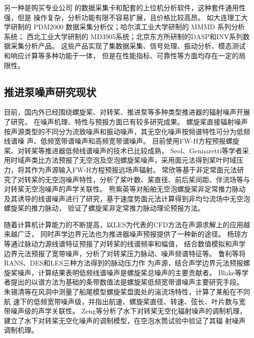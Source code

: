 另一种是购买专业公司
的数据采集卡和配套的上位机分析软件，这种套件通用性强，但是
操作复杂，分析功能有限不容易扩展，且价格比较高昂。
如大连理工大学研制的 PDM2000 数据采集分析仪；哈尔滨工业大学研制的 MMMD 系列分析系统；
西北工业大学研制的 MD3905系统；北京东方所研制的DASP和INV系列数据采集分析产品\cite{dingJi2014}。
这些产品实现了集数据采集、信号处理、振动分析、模态测试和响应计算等多种功能于一体，
但是在性能指标、可靠性等方面均存在一定的局限性。

\subsection{推进泵噪声研究现状}
目前，国内外已经围绕螺旋桨、对转桨、推进泵等多种类型推进器的辐射噪声开展了研究，
在噪声机理、特性与预报方面已有较多研究成果。
螺旋桨直接辐射噪声按声源类型的不同分为流致噪声和振动噪声，其无空化噪声按频谱特性可分为低频线谱噪
声、低频宽带谱噪声和高频宽带谱噪声\cite{cheng2019,xuye2019a}。
目前使用FW-H方程预报螺旋桨、对转桨等推进器低频线谱噪声的技术已比较成熟，
Seol、Gennaretti等学者采用时域声类比方法预报了无空泡及空泡螺旋桨噪声，采用面元法得到桨叶时域压力，将其作为声源输入FW-H方程预报远场声辐射\cite{seol2002,gennaretti2012}。
常欣等\cite{changxin2018}基于非定常面元法研究了对转桨的无空泡噪声特性，分析了桨叶数、桨直径、前后桨间距、伴流场等与对转桨无空泡噪声的声学关联性。
熊紫英等\cite{xiong2014}对船舶无空泡螺旋桨非定常推力脉动及其诱导的线谱噪声进行了研究，基于速度势面元法计算得到非均匀流场中无空泡螺旋桨的推力脉动，
验证了螺旋桨非定常推力脉动理论预报方法。

随着计算机计算能力的不断提高，以LES为代表的CFD方法在声源求解上的应用越来越广泛，
同时声学边界元法也为推进器噪声预报提供了一种新的途径。
杨琼方等\cite{__2016杨琼方}通过脉动力源线谱特征预报了对转桨的线谱频率和幅值，
结合数值模拟和声学边界元法预报了宽带噪声，分析了对转桨压力脉动、噪声频谱特征等。
鲁利等\cite{鲁利}将RANS、DES和LES三种方法得到的脉动压力作
为声源，结合声学边界元法预报螺旋桨噪声，计算结果表明低频线谱噪声是螺旋桨总噪声的主要贡献者。
Blake等学者提出的以谱方法为基础的条带数值法是螺旋桨低频宽带谱噪声主要研究手段\cite{1986Mechanics,jiang2020}。
朱锡清等\cite{朱锡清2006}在风洞中测量了船尾模型螺旋桨盘面处的湍流场特性，计算了某船在不同航
速下的低频宽带噪声级，并指出航速、螺旋桨直径、转速、弦长、叶片数与宽带噪声级的声学关联性。
Zeng等\cite{zeng2017,zeng2020a}分析了水下对转桨无空化辐射噪声的调制机理，建立了水下对转桨无空化噪声的调制模型，在空泡水筒试验中验证了其辐
射噪声调制机理。

